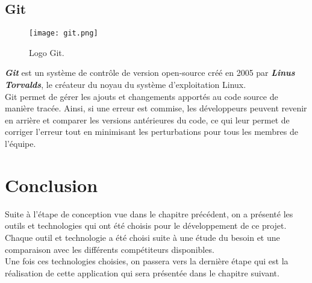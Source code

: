 \subsection{Git}
\vspace{1cm}
\begin{figure}[H]
    \centering
    \texttt{[image: git.png]}
    \vspace{1cm}
    \captionsetup{justification=centering}

    \caption{Logo Git.}
    \label{fig:git_logo}
\end{figure}
\textit{\textbf{Git}} \cite{git} est un système de contrôle de version open-source créé en 2005 par \textit{\textbf{Linus Torvalds}}, le créateur du noyau du système d'exploitation Linux.\\
\noindent Git permet de gérer les ajouts et changements apportés au code source de manière tracée. Ainsi, si une erreur est commise, les développeurs peuvent revenir en arrière et comparer les versions antérieures du code, ce qui leur permet de corriger l'erreur tout en minimisant les perturbations pour tous les membres de l'équipe.
\section{Conclusion}
Suite à l'étape de conception vue dans le chapitre précédent, on a présenté les outils et technologies qui ont été choisis pour le développement de ce projet.\\
\noindent Chaque outil et technologie a été choisi suite à une étude du besoin et une comparaison avec les différents compétiteurs disponibles.\\
Une fois ces technologies choisies, on passera vers la dernière étape qui est la réalisation de cette application qui sera présentée dans le chapitre suivant.